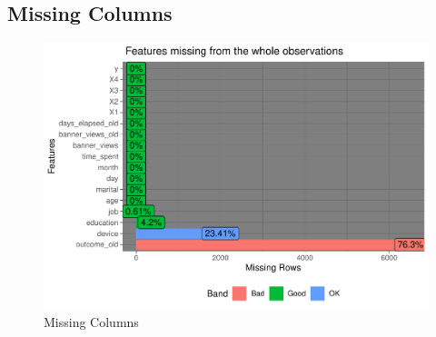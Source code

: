 \documentclass[
]{article}
\begin{document}
\subsection{Missing Columns}
\begin{figure}

{\centering \includegraphics[width=0.75\linewidth]{report_files/figure-latex/Missing variables-1} 

}

\caption{Missing Columns}\label{fig:Missing variables}
\end{figure}
\end{document}
